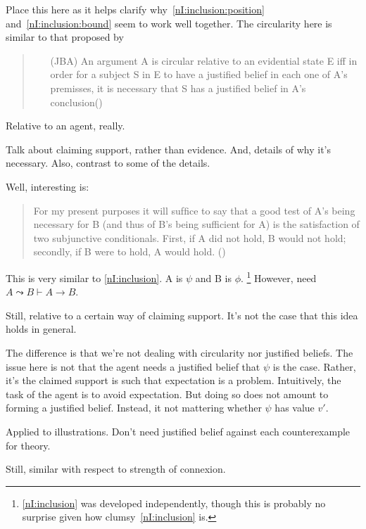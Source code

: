 \begin{note}[Literature]
  {
    \color{red}
    Place this here as it helps clarify why~\ref{nI:inclusion:position} and~\ref{nI:inclusion:bound} seem to work well together.
  }
  The circularity here is similar to that proposed by~\cite{Sgaravatti:2013wu}

  \begin{quote}
    \begin{itemize}
    \item[(JBA)] An argument A is circular relative to an evidential state E iff in order for a subject S in E to have a justiﬁed belief in each one of A’s premisses, it is necessary that S has a justiﬁed belief in A’s conclusion\nolinebreak \mbox{}\hfill\mbox{(\Citeyear[759]{Sgaravatti:2013wu})}
    \end{itemize}
  \end{quote}
  Relative to an agent, really.

  Talk about claiming support, rather than evidence.
  And, details of why it's necessary.
  Also, contrast to some of the details.

  Well, interesting is:
  \begin{quote}
    For my present purposes it will sufﬁce to say that a good test of A’s being necessary for B (and thus of B’s being sufficient for A) is the satisfaction of two subjunctive conditionals. First, if A did not hold, B would not hold; secondly, if B were to hold, A would hold.\nolinebreak
    \mbox{}\hfill\mbox{(\Citeyear[761]{Sgaravatti:2013wu})}
  \end{quote}
  This is very similar to \ref{nI:inclusion}.
  A is \(\psi\) and B is \(\phi\).\nolinebreak
  \footnote{
    \ref{nI:inclusion} was developed independently, though this is probably no surprise given how clumsy~\ref{nI:inclusion} is.
  }
  However, need \(A \leadsto B \vdash A \rightarrow B\).

  Still, relative to a certain way of claiming support.
  It's not the case that this idea holds in general.

  The difference is that we're not dealing with circularity nor justified beliefs.
  The issue here is not that the agent needs a justified belief that \(\psi\) is the case.
  Rather, it's the claimed support is such that expectation is a problem.
  Intuitively, the task of the agent is to avoid expectation.
  But doing so does not amount to forming a justified belief.
  Instead, it not mattering whether \(\psi\) has value \(v'\).

  Applied to illustrations.
  Don't need justified belief against each counterexample for theory.

  Still, similar with respect to strength of connexion.
\end{note}

